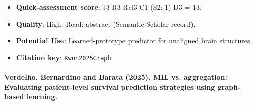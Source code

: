 \documentclass[journal,onecolumn]{IEEEtran}
\begin{document}
\begin{itemize}
\item{} \textbf{Quick-assessment score}: J3 R3 Rel3 C1 (S2: 1) D3 = 13.

\item{} \textbf{Quality}: High. Read: abstract (Semantic Scholar record).

\item{} \textbf{Potential Use}: Learned-prototype predictor for unaligned brain structures.

\item{} \textbf{Citation key}: \texttt{Kwon2025Graph}

\end{itemize}

\paragraph{Verdelho, Bernardino and Barata (2025). MIL vs. aggregation: Evaluating patient-level survival prediction strategies using graph-based learning.~\cite{Verdelho2025MIL}}\mbox{}
\end{document}
